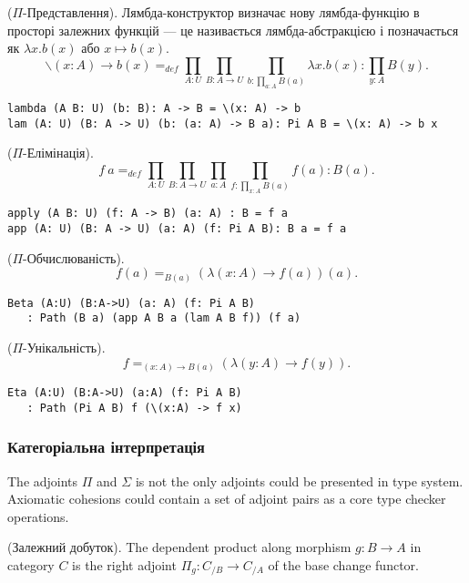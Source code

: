 \begin{definition} ($\Pi$-Представлення). Лямбда-конструктор визначає
нову лямбда-функцію в просторі залежних функцій — це називається
лямбда-абстракцією і позначається як $\lambda x. b(x)$ або $x \mapsto b(x)$.
$$\backslash (x: A) \rightarrow b(x) =_{def} \prod_{A:U}\prod_{B:A \rightarrow U}\prod_{b:\prod_{a:A}B(a)}\lambda x.b(x) : \prod_{y:A}B(y).$$
\begin{lstlisting}
lambda (A B: U) (b: B): A -> B = \(x: A) -> b
lam (A: U) (B: A -> U) (b: (a: A) -> B a): Pi A B = \(x: A) -> b x
\end{lstlisting}
\end{definition}

\begin{definition} ($\Pi$-Елімінація).
$$f\ a =_{def} \prod_{A:U}\prod_{B: A \rightarrow U}\prod_{a:A}\prod_{f: \prod_{x:A}B(a)}f(a) : B(a).$$
\begin{lstlisting}
apply (A B: U) (f: A -> B) (a: A) : B = f a
app (A: U) (B: A -> U) (a: A) (f: Pi A B): B a = f a
\end{lstlisting}
\end{definition}

\newpage
\begin{theorem} ($\Pi$-Обчислюваність).
$$f(a) =_{B(a)} (\lambda (x:A) \rightarrow f(a))(a).$$
\begin{lstlisting}
Beta (A:U) (B:A->U) (a: A) (f: Pi A B)
   : Path (B a) (app A B a (lam A B f)) (f a)
\end{lstlisting}
\end{theorem}

\begin{theorem} ($\Pi$-Унікальність).
$$f =_{(x:A)\rightarrow B(a)} (\lambda (y:A) \rightarrow f(y)).$$
\begin{lstlisting}
Eta (A:U) (B:A->U) (a:A) (f: Pi A B)
   : Path (Pi A B) f (\(x:A) -> f x)
\end{lstlisting}
\end{theorem}

\subsubsection*{Категоріальна інтерпретація}
The adjoints $\Pi$ and $\Sigma$ is not the only adjoints could be presented in type system.
Axiomatic cohesions could contain a set of adjoint pairs as a core type checker operations.

\begin{definition} (Залежний добуток).
The dependent product along morphism $g: B \rightarrow A$ in category $C$ is the right
adjoint $\Pi_g : C_{/B} \rightarrow C_{/A}$ of the base change functor.
\end{definition}

